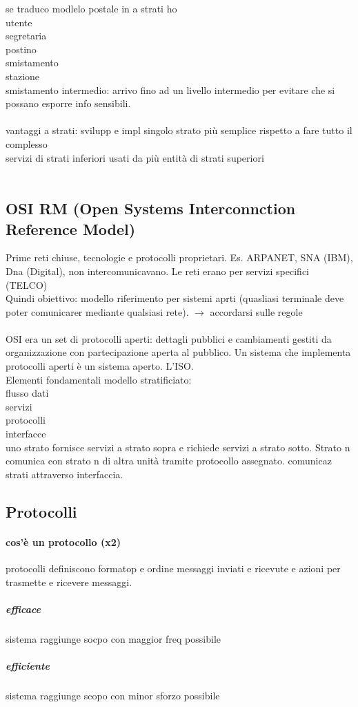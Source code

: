 \documentclass[10pt]{article}
\begin{document}
se traduco modlelo postale in a strati ho\\
utente\\segretaria\\postino\\smistamento\\stazione\\
smistamento intermedio: arrivo fino ad un livello intermedio per evitare che si possano esporre info sensibili.\\\\
vantaggi a strati: svilupp e impl singolo strato più semplice rispetto a fare tutto il complesso\\
servizi di strati inferiori usati da più entità di strati superiori\\\\
\subsection{OSI RM (Open Systems Interconnction Reference Model)}
Prime reti chiuse, tecnologie e protocolli proprietari. Es. ARPANET, SNA (IBM), Dna (Digital), non intercomunicavano. Le reti erano per servizi specifici (TELCO)\\
Quindi obiettivo: modello riferimento per sistemi aprti (quasliasi terminale deve poter comunicarer mediante qualsiasi rete). $\rightarrow$ accordarsi sulle regole\\\\
OSI era un set di protocolli aperti: dettagli pubblici e cambiamenti gestiti da organizzazione con partecipazione aperta al pubblico. Un sistema che implementa protocolli aperti è un sistema aperto. L'ISO.\\
Elementi fondamentali modello stratificiato:\\
flusso dati\\servizi\\protocolli\\interfacce\\
uno strato fornisce servizi a strato sopra e richiede servizi a strato sotto. Strato n comunica con strato n di altra unità tramite protocollo assegnato. comunicaz strati attraverso interfaccia.\\

\subsection{Protocolli}
\paragraph{cos'è un protocollo (x2)} protocolli definiscono formatop e ordine messaggi inviati e ricevute e azioni per trasmette e ricevere messaggi.
\subparagraph{efficace} sistema raggiunge socpo con maggior freq possibile
\subparagraph{efficiente} sistema raggiunge scopo con minor sforzo possibile
\end{document}
